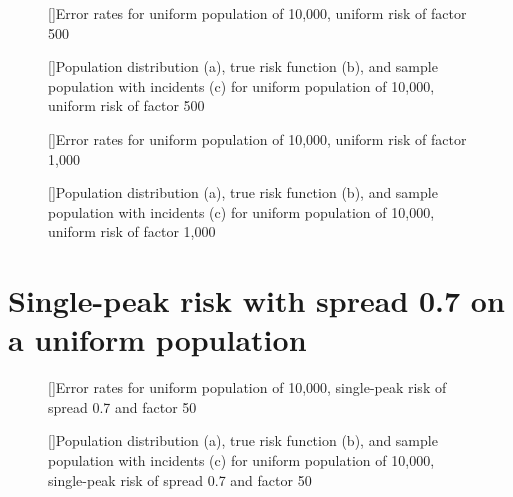 {%

\begin{figure}[!htb]
    
    []{Error rates for uniform population of 10,000, uniform risk of \gls{factor} 500}
    \label{tab:mean_error_rates:unif_500_unif}
    
    []{Population distribution (a), true risk function (b), and sample population with incidents (c) for uniform population of 10,000, uniform risk of \gls{factor} 500}
    \label{fig:distributions:unif_500_unif}    
\end{figure}



\begin{figure}[!htb]
    
    []{Error rates for uniform population of 10,000, uniform risk of \gls{factor} 1,000}
    \label{tab:mean_error_rates:unif_1000_unif}
    
    []{Population distribution (a), true risk function (b), and sample population with incidents (c) for uniform population of 10,000, uniform risk of \gls{factor} 1,000}
    \label{fig:distributions:unif_1000_unif}    
\end{figure}

\section{Single-peak risk with spread 0.7 on a uniform population}
\label{sec:app:results_unif_0.7_1h}


\begin{figure}[!htb]
    
    []{Error rates for uniform population of 10,000, single-peak risk of spread 0.7 and \gls{factor} 50}
    \label{tab:mean_error_rates:unif_50_0.7_1h}
    
    []{Population distribution (a), true risk function (b), and sample population with incidents (c) for uniform population of 10,000, single-peak risk of \gls{spread} 0.7 and \gls{factor} 50}
    \label{fig:distributions:unif_50_0.7_1h}    
\end{figure}


}
